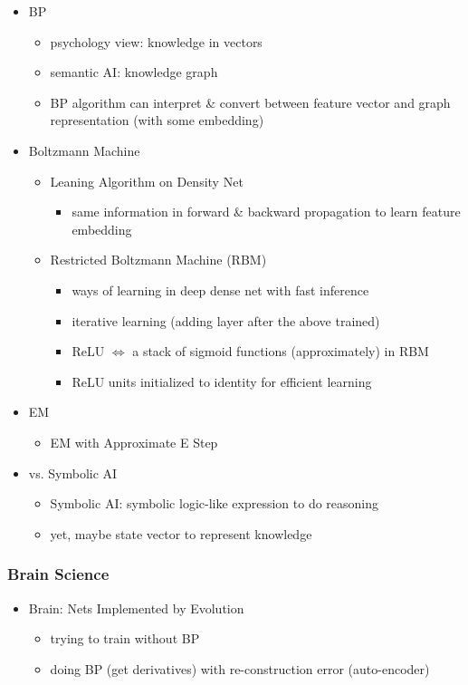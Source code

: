 \begin{itemize}
	\item BP
	\begin{itemize}
		\item psychology view: knowledge in vectors
		\item semantic AI: knowledge graph
		\item BP algorithm can interpret \& convert between feature vector and graph representation (with some embedding)
	\end{itemize}
	\item Boltzmann Machine
	\begin{itemize}
	\item Leaning Algorithm on Density Net
		\begin{itemize}
		\item same information in forward \& backward propagation to learn feature embedding
		\end{itemize}
	\item Restricted Boltzmann Machine (RBM)
		\begin{itemize}
		\item ways of learning in deep dense net with fast inference
		\item iterative learning (adding layer after the above trained)
		\item ReLU $\Leftrightarrow$ a stack of sigmoid functions (approximately) in RBM
		\item ReLU units initialized to identity for efficient learning
		\end{itemize}
	\end{itemize}
	
	\item EM
		\begin{itemize}
		\item EM with Approximate E Step
		\end{itemize}
	
	\item vs. Symbolic AI
		\begin{itemize}
		\item Symbolic AI: symbolic logic-like expression to do reasoning
		\item yet, maybe state vector to represent knowledge
		\end{itemize}
\end{itemize}

\subsubsection{Brain Science}
\begin{itemize}
\item Brain: Nets Implemented by Evolution
	\begin{itemize}
	\item trying to train without BP
	\item doing BP (get derivatives) with re-construction error (auto-encoder)
	\end{itemize}
\end{itemize}

